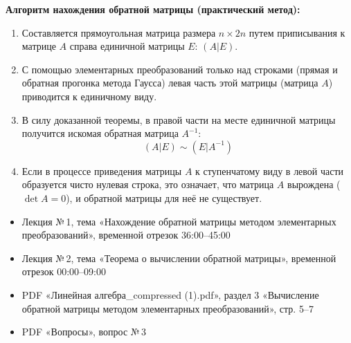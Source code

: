 \textbf{Алгоритм нахождения обратной матрицы (практический метод):}

\begin{enumerate}
    \item Составляется прямоугольная матрица размера $n \times 2n$ путем приписывания к матрице $A$ справа единичной матрицы $E$: $(A | E)$.
    \item С помощью элементарных преобразований только над строками (прямая и обратная прогонка метода Гаусса) левая часть этой матрицы (матрица $A$) приводится к единичному виду.
    \item В силу доказанной теоремы, в правой части на месте единичной матрицы получится искомая обратная матрица $A^{-1}$:
    \[ (A | E) \sim (E | A^{-1}) \]
    \item Если в процессе приведения матрицы $A$ к ступенчатому виду в левой части образуется чисто нулевая строка, это означает, что матрица $A$ вырождена ($\det A = 0$), и обратной матрицы для неё не существует.
\end{enumerate}

\begin{tcolorbox}[title=Источники, colback=gray!10]
\begin{itemize}
  \item Лекция №\,1, тема «Нахождение обратной матрицы методом элементарных преобразований», временной отрезок 36:00--45:00
  \item Лекция №\,2, тема «Теорема о вычислении обратной матрицы», временной отрезок 00:00--09:00
  \item PDF «Линейная алгебра\_compressed (1).pdf», раздел 3 «Вычисление обратной матрицы методом элементарных преобразований», стр. 5--7
  \item PDF «Вопросы», вопрос №\,3
\end{itemize}
\end{tcolorbox}
